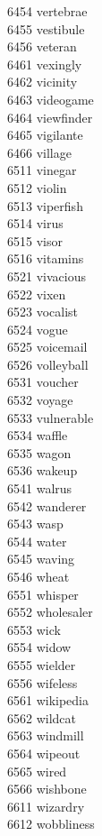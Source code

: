 6454 vertebrae \\
6455 vestibule \\
6456 veteran \\
6461 vexingly \\
6462 vicinity \\
6463 videogame \\
6464 viewfinder \\
6465 vigilante \\
6466 village \\
6511 vinegar \\
6512 violin \\
6513 viperfish \\
6514 virus \\
6515 visor \\
6516 vitamins \\
6521 vivacious \\
6522 vixen \\
6523 vocalist \\
6524 vogue \\
6525 voicemail \\
6526 volleyball \\
6531 voucher \\
6532 voyage \\
6533 vulnerable \\
6534 waffle \\
6535 wagon \\
6536 wakeup \\
6541 walrus \\
6542 wanderer \\
6543 wasp \\
6544 water \\
6545 waving \\
6546 wheat \\
6551 whisper \\
6552 wholesaler \\
6553 wick \\
6554 widow \\
6555 wielder \\
6556 wifeless \\
6561 wikipedia \\
6562 wildcat \\
6563 windmill \\
6564 wipeout \\
6565 wired \\
6566 wishbone \\
6611 wizardry \\
6612 wobbliness \\
